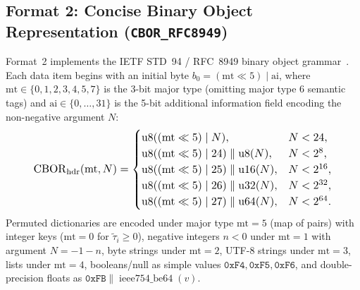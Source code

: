 \documentclass[conference,10pt]{IEEEtran}
\begin{document}
\subsection{Format 2: Concise Binary Object Representation (\texttt{CBOR\_RFC8949})}
Format~2 implements the IETF STD~94 / RFC~8949 binary object grammar~\cite{bormann2020cbor}. Each data item begins with an initial byte $b_0 = (\text{mt} \ll 5) \mid \text{ai}$, where $\text{mt} \in \{0,1,2,3,4,5,7\}$ is the 3-bit major type (omitting major type $6$ semantic tags) and $\text{ai} \in \{0,\dots,31\}$ is the 5-bit additional information field encoding the non-negative argument $N$:
\begin{equation}
\label{eq:cbor_head}
\resizebox{0.88\columnwidth}{!}{$\displaystyle
\operatorname{CBOR}_{\text{hdr}}(\text{mt}, N) = \begin{cases}
\operatorname{u8}((\text{mt} \ll 5) \mid N), & N < 24, \\
\operatorname{u8}((\text{mt} \ll 5) \mid 24) \parallel \operatorname{u8}(N), & N < 2^8, \\
\operatorname{u8}((\text{mt} \ll 5) \mid 25) \parallel \operatorname{u16}(N), & N < 2^{16}, \\
\operatorname{u8}((\text{mt} \ll 5) \mid 26) \parallel \operatorname{u32}(N), & N < 2^{32}, \\
\operatorname{u8}((\text{mt} \ll 5) \mid 27) \parallel \operatorname{u64}(N), & N < 2^{64}.
\end{cases}
$}
\end{equation}
Permuted dictionaries are encoded under major type $\text{mt} = 5$ (map of pairs) with integer keys ($\text{mt} = 0$ for $\tilde{\tau}_i \ge 0$), negative integers $n < 0$ under $\text{mt} = 1$ with argument $N = -1 - n$, byte strings under $\text{mt} = 2$, UTF-8 strings under $\text{mt} = 3$, lists under $\text{mt} = 4$, booleans/null as simple values $\mathtt{0xF4}, \mathtt{0xF5}, \mathtt{0xF6}$, and double-precision floats as $\mathtt{0xFB} \parallel \operatorname{ieee754\_be64}(v)$.
\end{document}
